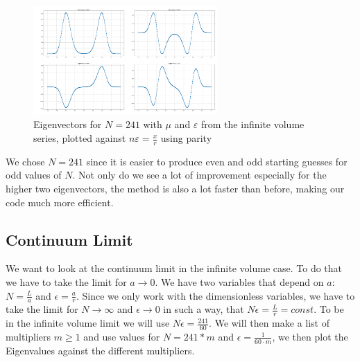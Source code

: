 \documentclass[11pt, letterpaper, onecolumn]{article}
\begin{document}
  	\begin{figure} [h] 
	\begin{center}
	\includegraphics[width=7cm]{"eigenvectors_Parity.png"}
	\caption{Eigenvectors for $N=241$ with $\mu$ and $\varepsilon$ from the infinite volume series, plotted against $n\varepsilon=\frac{x}{r}$ using parity}
	\end{center}
	\end{figure}
 	We chose $N=241$ since it is easier to produce even and odd starting guesses for odd values of $N$. Not only do we see a lot of improvement especially for the higher two eigenvectors, the method is also a lot faster than before, making our code much more efficient.
	\subsection{Continuum Limit}
    	We want to look at the continuum limit in the infinite volume case. To do that we have to take the limit for $a\rightarrow0$. We have two variables that depend on $a$: $N=\frac{L}{a}$ and $\epsilon=\frac{a}{r}$. Since we only work with the dimensionless variables, we have to take the limit for $N\rightarrow\infty$ and $\epsilon\rightarrow0$ in such a way, that $N\epsilon=\frac{L}{r}=const$. To be in the infinite volume limit we will use $N\epsilon=\frac{241}{60}$. We will then make a list of multipliers $m\geq1$ and use values for $N=241*m$ and $\epsilon=\frac{1}{60\cdot m}$, we then plot the Eigenvalues against the different multipliers.










	
\end{document}
